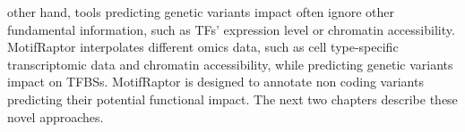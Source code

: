 \documentclass[a4paper, titlepage, openright]{book}
\newcommand{\mychapter}[2]{
    \setcounter{chapter}{#1}
    \setcounter{section}{0}
    \chapter*{#2}
    \addcontentsline{toc}{chapter}{#2}
}
\newcommand{\grafimo}{GRAFIMO\xspace}
\newcommand{\motifraptor}{MotifRaptor\xspace}
\begin{document}
other hand, tools predicting genetic variants impact often ignore other fundamental information, such as TFs' expression level or chromatin accessibility. \motifraptor \citep{yao2021motif} interpolates different omics data, such as cell type-specific transcriptomic data and chromatin accessibility, while predicting genetic variants impact on TFBSs. \motifraptor is designed to annotate non coding variants predicting their potential functional impact. The next two chapters describe these novel approaches.


\end{document}
